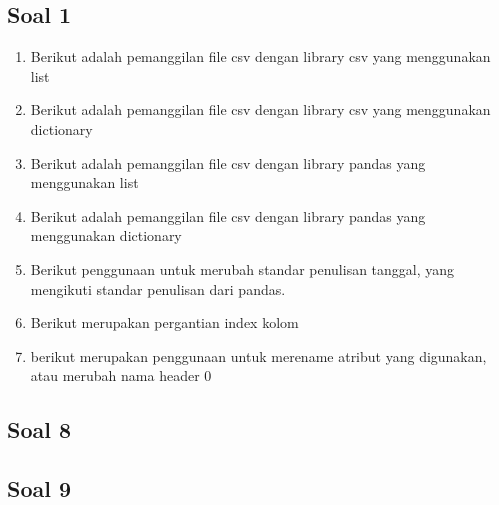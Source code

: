 \subsection{Soal 1}
\begin{enumerate}
\item Berikut adalah pemanggilan file csv dengan library csv yang menggunakan list


\item Berikut adalah pemanggilan file csv dengan library csv yang menggunakan dictionary


\item Berikut adalah pemanggilan file csv dengan library pandas yang menggunakan list


\item Berikut adalah pemanggilan file csv dengan library pandas yang menggunakan dictionary


\item Berikut penggunaan untuk merubah standar penulisan tanggal, yang mengikuti standar penulisan dari pandas.


\item Berikut merupakan pergantian index kolom


\item berikut merupakan penggunaan untuk merename atribut yang digunakan, atau merubah nama header 0

\end{enumerate}

\subsection{Soal 8}


\subsection{Soal 9}



